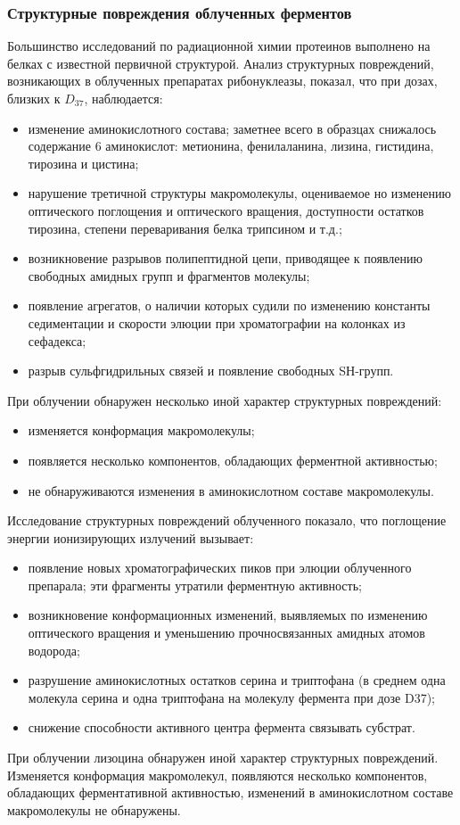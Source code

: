 \documentclass[a4paper, 14pt]{article}
\renewcommand{\emph}[1]{{\color{orange}{\textit{\textbf{#1}}}}}
\begin{document}
\subsubsection{Структурные повреждения облученных ферментов}
Большинство исследований по радиационной химии протеинов выполнено на
белках с известной первичной структурой.
Анализ структурных повреждений, возникающих в облученных препаратах
рибонуклеазы, показал, что при дозах, близких к $D_{37}$, наблюдается:
\begin{itemize}
    \item изменение аминокислотного состава; заметнее всего в образцах снижалось
    содержание 6 аминокислот: метионина, фенилаланина, лизина, гистидина, тирозина и
    цистина;
   \item нарушение третичной структуры макромолекулы, оцениваемое но изменению
    оптического поглощения и оптического вращения, доступности остатков тирозина,
    степени переваривания белка трипсином и т.д.;
   \item возникновение разрывов полипептидной цепи, приводящее к появлению
    свободных амидных групп и фрагментов молекулы;
   \item появление агрегатов, о наличии которых судили по изменению константы
    седиментации и скорости элюции при хроматографии на колонках из сефадекса;
   \item разрыв сульфгидрильных связей и появление свободных SН-групп.
\end{itemize}
При облучении \emph{лизоцима} обнаружен несколько иной характер структурных повреждений:
\begin{itemize}
   \item изменяется конформация макромолекулы;
   \item появляется несколько компонентов, обладающих ферментной активностью;
   \item не обнаруживаются изменения в аминокислотном составе макромолекулы.
\end{itemize}
Исследование структурных повреждений облученного \emph{химотрипсина} показало,
что поглощение энергии ионизирующих излучений вызывает:
\begin{itemize}
    \item появление новых хроматографических пиков при элюции облученного
    препарала; эти фрагменты утратили ферментную активность;
   \item возникновение конформационных изменений, выявляемых по изменению
    оптического вращения и уменьшению прочносвязанных амидных атомов водорода;
   \item разрушение аминокислотных остатков серина и триптофана (в среднем одна
    молекула серина и одна триптофана на молекулу фермента при дозе D37); %
   \item снижение способности активного центра фермента связывать субстрат.
\end{itemize}
При облучении лизоцина обнаружен иной характер структурных повреждений.
Изменяется конформация макромолекул, появляются несколько компонентов,
обладающих ферментативной активностью, изменений в аминокислотном составе макромолекулы не обнаружены.
\end{document}
